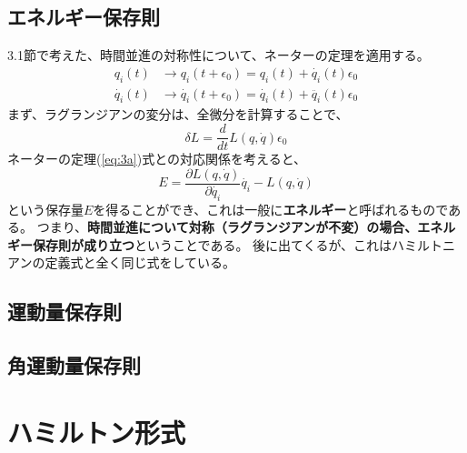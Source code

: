 \documentclass[a4paper]{jsreport}
\begin{document}
        \section{エネルギー保存則}
            3.1節で考えた、時間並進の対称性について、ネーターの定理を適用する。
            \begin{align}
                q_i(t) &\to q_i(t + \epsilon_0) = q_i(t) + \dot{q_i}(t)\epsilon_0 \\
                \dot{q_i}(t) &\to \dot{q_i}(t + \epsilon_0) = \dot{q_i}(t) + \ddot{q_i}(t)\epsilon_0
            \end{align}
            まず、ラグランジアンの変分は、全微分を計算することで、
            \begin{equation}
                \delta L = \frac{d}{dt} L(q, \dot{q})\epsilon_0
            \end{equation}
            ネーターの定理(\ref{eq:3a})式との対応関係を考えると、
            \begin{equation} \label{eq:3b}
                E = \frac{\partial L(q, \dot{q})}{\partial \dot{q_i}} \dot{q_i} - L(q, \dot{q})
            \end{equation}
            という保存量$E$を得ることができ、これは一般に\textbf{エネルギー}と呼ばれるものである。
            つまり、\textbf{時間並進について対称（ラグランジアンが不変）の場合、エネルギー保存則が成り立つ}ということである。
            後に出てくるが、これはハミルトニアンの定義式と全く同じ式をしている。


        \section{運動量保存則}
        \section{角運動量保存則}

    \chapter{ハミルトン形式}
\end{document}
